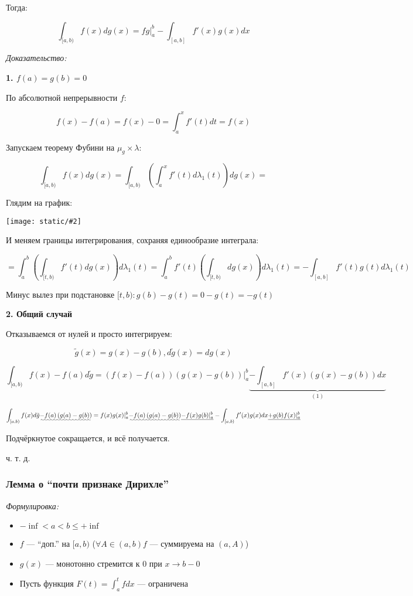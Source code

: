 \documentclass{article}
\def\images#1#2{\begin{center}\texttt{[image: static/\#2]}\end{center}}
\begin{document}
Тогда:

\[\int_{[a, b)} f(x) dg(x) = fg|_{a}^{b} - \int_{[a, b]} f'(x)g(x)dx\]

\textit{Доказательство:}

\textbf{1. $f(a) = g(b) = 0$}

По абсолютной непрерывности $f$: 

\[f(x) - f(a) = f(x) - 0 = \int_a^x f'(t)dt = f(x)\]

Запускаем теорему Фубини на $\mu_g \times \lambda$:

\[\int_{[a, b)} f(x) dg(x) = \int_{[a, b)} \left( \int_a^x f'(t) d \lambda_1(t)\right) dg(x) = \]

Глядим на график:

\images{0.5}{po_chast.jpg}

И меняем границы интегрирования, сохраняя единообразие интеграла:

\[ = \int_a^b \left( \int_{[t, b)} f'(t) dg(x)\right) d\lambda_1(t) = \int_a^b f'(t) \left( \int_{[t, b)} dg(x)\right) d \lambda_1(t) = - \int_{[a, b]} f'(t) g(t) d\lambda_1(t)\]

Минус вылез при подстановке $[t, b): g(b) - g(t) = 0 - g(t) = -g(t)$

\textbf{2. Общий случай}

Отказываемся от нулей и просто интегрируем:

\[\tilde{g}(x) = g(x) - g(b), d\tilde{g}(x) = dg(x)\]

\[\int_{[a, b)} f(x) - f(a) d\tilde{g} = \left(f(x) - f(a)\right)\left(g(x) - g(b)\right)|_a^b \underbrace{-\int_{[a, b]} f'(x) \left(g(x) - g(b)\right) dx}_{(1)} \]

\[\int_{[a, b)} f(x) d\tilde{g} \uwave{- f(a)\left(g(a) - g(b)\right)} = f(x)g(x)|_a^b \uwave{- f(a)\left(g(a) - g(b)\right)} \underline{- f(x)g(b)|_a^b} - \int_{[a, b)} f'(x)g(x)dx \underline{ +g(b) f(x)|_a^b} \]

Подчёркнутое сокращается, и всё получается.

ч. т. д. 

\subsubsection{Лемма о  ``почти признаке Дирихле''}
\textit{Формулировка:}

\begin{itemize}
    \item $-\inf < a < b \le +\inf$
    \item $f$ --- ``доп.'' на $[a, b)$ ($\forall A \in (a, b) f$ --- суммируема на $(a, A)$)
    \item $g(x)$ --- монотонно стремится к 0 при $x \rightarrow b - 0$
    \item Пусть функция $F(t) = \int_{a}^{t} fdx$ --- ограничена
\end{itemize}
\end{document}
